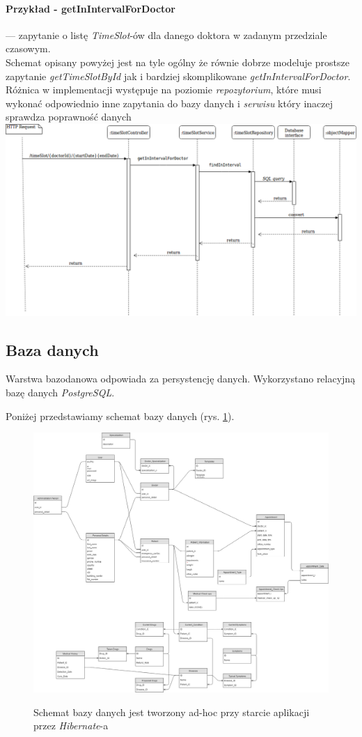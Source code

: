 \documentclass[polish,12pt]{aghthesis}
\begin{document}
\paragraph{Przykład - getInIntervalForDoctor} --- zapytanie o listę \emph{TimeSlot}-ów dla danego doktora w zadanym przedziale czasowym. \\
Schemat opisany powyżej jest na tyle ogólny że równie dobrze modeluje prostsze zapytanie \emph{getTimeSlotById} jak i bardziej skomplikowane \emph{getInIntervalForDoctor}. Różnica w implementacji występuje na poziomie \emph{repozytorium}, które musi wykonać odpowiednio inne zapytania do bazy danych i \emph{serwisu} który inaczej sprawdza poprawność danych
\includegraphics[width=\textwidth]{inIntervalDorDoctor}


\subsection{Baza danych}
Warstwa bazodanowa odpowiada za persystencję danych. Wykorzystano relacyjną bazę danych \emph{PostgreSQL}.

Poniżej przedstawiamy schemat bazy danych (rys. \ref{db-schema}).

\begin{figure}[H]
    \caption{Schemat bazy danych jest tworzony ad-hoc przy starcie aplikacji przez \emph{Hibernate}-a}
    \includegraphics[width=\textwidth]{db-schema}
    \label{db-schema}
\end{figure}
\end{document}
